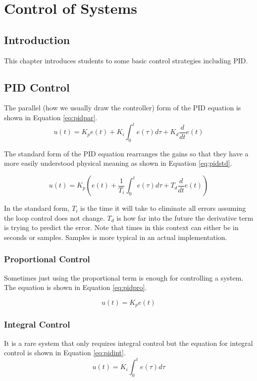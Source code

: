 \chapter{Control of Systems}

\section{Introduction}
This chapter introduces students to some basic control strategies including PID.


\section{PID Control}
The parallel (how we usually draw the controller) form of the PID 
equation is shown in Equation \ref{eq:pidpar}.
\begin{equation}
    \label{eq:pidpar}
    u(t) = K_p e(t) + K_i\int_0^t e(\tau)d\tau + K_d\frac{d}{dt}e(t)
\end{equation}

The standard form of the PID equation rearranges the gains so that they have
a more easily understood physical meaning as shown in Equation \ref{eq:pidstd}.

\begin{equation}
    \label{eq:pidstd}
    u(t) = K_p\left(e(t) + \frac{1}{T_i}\int_0^t e(\tau)d\tau + T_d\frac{d}{dt}e(t)\right)
\end{equation}

In the standard form, $T_i$ is the time it will take to eliminate all errors
assuming the loop control does not change. $T_d$ is how far into the future
the derivative term is trying to predict the error. Note that times in this 
context can either be in seconds or samples. Samples is more typical in an 
actual implementation.

\subsection{Proportional Control}
Sometimes just using the proportional term is enough for controlling a system.
The equation is shown in Equation \ref{eq:pidpro}.

\begin{equation}
    \label{eq:pidpro}
    u(t) = K_p e(t)    
\end{equation}

\subsection{Integral Control}
It is a rare system that only requires integral control but the equation 
for integral control is shown in Equation \ref{eq:pidint}.
\begin{equation}
    \label{eq:pidint}
    u(t) = K_i\int_0^t e(\tau)d\tau   
\end{equation}

